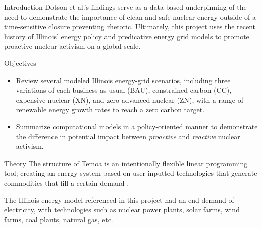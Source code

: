 \documentclass[final]{beamer}
\newlength{\onecolwid}
\newlength{\threecolwid}
\begin{document}
\begin{frame}[t]
\begin{columns}[t,totalwidth=\threecolwid]
\begin{column}{\onecolwid}
\begin{block}{Introduction}
	Dotson et al.'s findings serve as a data-based underpinning of the need to demonstrate the importance of clean and safe nuclear energy outside of a time-sensitive closure preventing rhetoric. Ultimately, this project uses the recent history of Illinois' energy policy and predicative energy grid models to promote proactive nuclear activism on a global scale.
	\vspace{0.7em}


	\end{block}


	\begin{alertblock}{Objectives}
	\begin{itemize}
			\item Review several modeled Illinois energy-grid scenarios, including three variations of each business-as-usual (BAU), constrained carbon (CC), expensive nuclear (XN), and zero advanced nuclear (ZN), with a range of renewable energy growth rates to reach a zero carbon target.
		\item Summarize computational models in a policy-oriented manner to demonstrate the difference in potential impact between \textit{proactive} and \textit{reactive} nuclear activism.
	\end{itemize}

	\end{alertblock}


\begin{block}{Theory}
The structure of Temoa is an intentionally flexible linear programming tool; creating an energy system based on user inputted technologies that generate commodities that fill a certain demand \cite{decarolis}.
\vspace{0.7em}

The Illinois energy model referenced in this project had an end demand of electricity, with technologies such as nuclear power plants, solar farms, wind farms, coal plants, natural gas, etc.
\vspace{0.7em}


\end{block}
\end{column}
\end{columns}
\end{frame}
\end{document}
